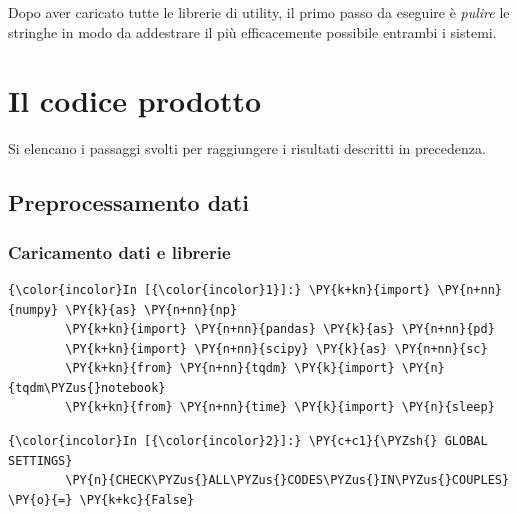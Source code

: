 \documentclass[12pt,a4paper,twoside,openright]{book}
\begin{document}
Dopo aver caricato tutte le librerie di utility, il primo passo da eseguire è \emph{pulire} le stringhe in modo da addestrare il più efficacemente possibile entrambi i sistemi.


\chapter{Il codice prodotto}

Si elencano i passaggi svolti per raggiungere i risultati descritti in precedenza.

\hypertarget{preprocessamento-dati}{%
\section{Preprocessamento dati}\label{preprocessamento-dati}}

    \hypertarget{caricamento-dati-e-librerie}{%
\subsection{Caricamento dati e
librerie}\label{caricamento-dati-e-librerie}}

    \begin{Verbatim}[commandchars=\\\{\}]
{\color{incolor}In [{\color{incolor}1}]:} \PY{k+kn}{import} \PY{n+nn}{numpy} \PY{k}{as} \PY{n+nn}{np}
        \PY{k+kn}{import} \PY{n+nn}{pandas} \PY{k}{as} \PY{n+nn}{pd}
        \PY{k+kn}{import} \PY{n+nn}{scipy} \PY{k}{as} \PY{n+nn}{sc}
        \PY{k+kn}{from} \PY{n+nn}{tqdm} \PY{k}{import} \PY{n}{tqdm\PYZus{}notebook}
        \PY{k+kn}{from} \PY{n+nn}{time} \PY{k}{import} \PY{n}{sleep}
\end{Verbatim}


    \begin{Verbatim}[commandchars=\\\{\}]
{\color{incolor}In [{\color{incolor}2}]:} \PY{c+c1}{\PYZsh{} GLOBAL SETTINGS}
        \PY{n}{CHECK\PYZus{}ALL\PYZus{}CODES\PYZus{}IN\PYZus{}COUPLES} \PY{o}{=} \PY{k+kc}{False}
\end{Verbatim}
\end{document}
